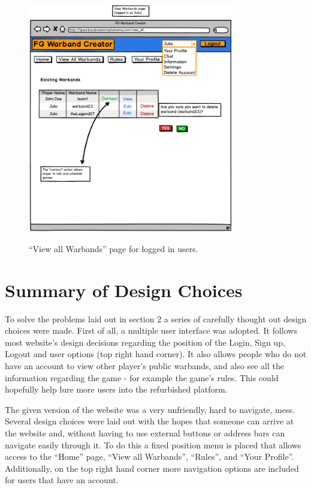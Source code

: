 \documentclass[12pt,a4paper]{article}
\begin{document}
\begin{figure}[h!]
 \centering
 \includegraphics[width=0.8\textwidth]{img/view_all_loggedin}
 \label{fig:10}
 \caption{``View all Warbands'' page for logged in users.}
\end{figure}

\section{Summary of Design Choices}

To solve the problems laid out in section 2 a series of carefully thought out design choices were made. First of all, a multiple user interface was adopted. It follows most website's design decisions regarding the position of the Login, Sign up, Logout and user options (top right hand corner). It also allows people who do not have an account to view other player's public warbands, and also see all the information regarding the game - for example the game's rules. This could hopefully help lure more users into the refurbished platform.

The given version of the website was a very unfriendly, hard to navigate, mess. Several design choices were laid out with the hopes that someone can arrive at the website and, without having to use external buttons or address bars can navigate easily through it. To do this a fixed position menu is placed that allows access to the ``Home'' page, ``View all Warbands'', ``Rules'', and ``Your Profile''. Additionally, on the top right hand corner more navigation options are included for users that have an account. 
\end{document}
